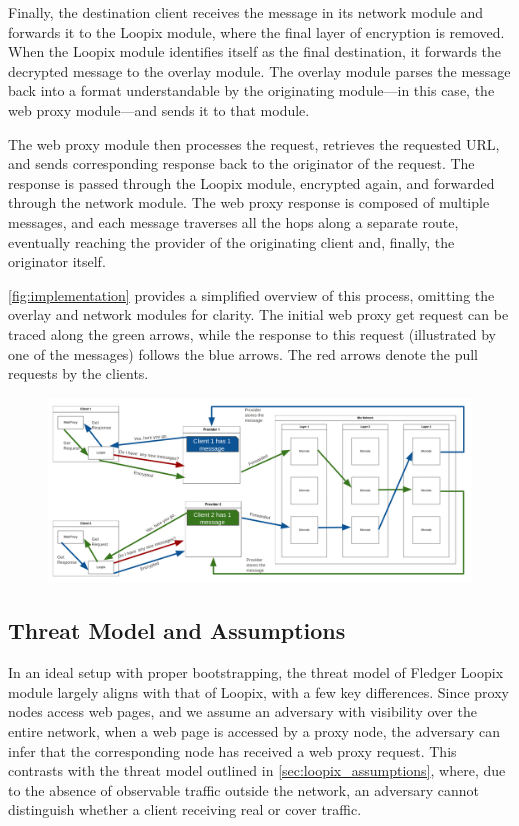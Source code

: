 \documentclass[a4paper,11pt,oneside]{report}
\begin{document}
Finally, the destination client receives the message in its network module and forwards it to the Loopix module, where the final layer of encryption is removed. When the Loopix module identifies itself as the final destination, it forwards the decrypted message to the overlay module. The overlay module parses the message back into a format understandable by the originating module—in this case, the web proxy module—and sends it to that module.

The web proxy module then processes the request, retrieves the requested URL, and sends corresponding response back to the originator of the request. The response is passed through the Loopix module, encrypted again, and forwarded through the network module. The web proxy response is composed of multiple messages, and each message traverses all the hops along a separate route, eventually reaching the provider of the originating client and, finally, the originator itself.

\autoref{fig:implementation} provides a simplified overview of this process, omitting the overlay and network modules for clarity. The initial web proxy get request can be traced along the green arrows, while the response to this request (illustrated by one of the messages) follows the blue arrows. The red arrows denote the pull requests by the clients.

\begin{figure}[H]
    \centering
    \includegraphics[width=1\linewidth]{plots/implementation.png}
    \caption{}
    \label{fig:implementation}
\end{figure}

\subsection{Threat Model and Assumptions}

In an ideal setup with proper bootstrapping, the threat model of Fledger Loopix module largely aligns with that of Loopix, with a few key differences. Since proxy nodes access web pages, and we assume an adversary with visibility over the entire network, when a web page is accessed by a proxy node, the adversary can infer that the corresponding node has received a web proxy request. This contrasts with the threat model outlined in \autoref{sec:loopix_assumptions}, where, due to the absence of observable traffic outside the network, an adversary cannot distinguish whether a client receiving real or cover traffic.
\end{document}
